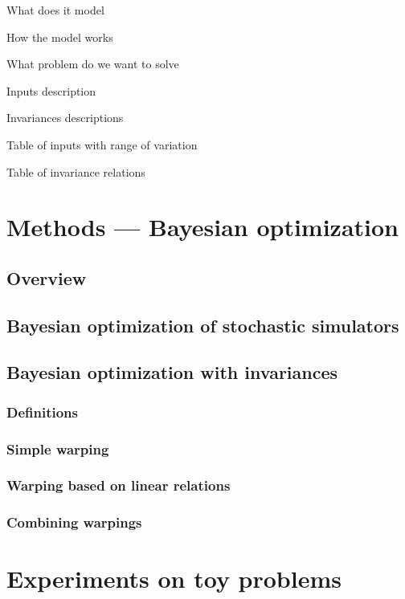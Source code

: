 What does it model

How the model works

What problem do we want to solve

Inputs description

Invariances descriptions

Table of inputs with range of variation

Table of invariance relations

\section{Methods — Bayesian optimization}

\subsection{Overview}

\subsection{Bayesian optimization of stochastic simulators}

\subsection{Bayesian optimization with invariances}

\subsubsection{Definitions}

\subsubsection{Simple warping}

\subsubsection{Warping based on linear relations}

\subsubsection{Combining warpings}

\section{Experiments on toy problems}

